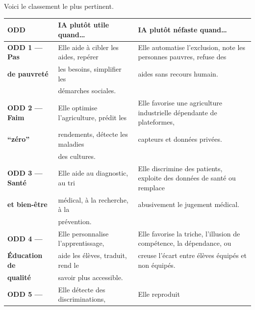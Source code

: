 \documentclass[
  10pt,
  a4paper,
  DIV=11,
  numbers=noendperiod,
  oneside]{scrreprt}
\newcounter{none} %
\let\oldtextbf\textbf
\renewcommand{\textbf}[1]{\oldtextbf{\textcolor{cmmnavy}{#1}}}
\begin{document}
Voici le classement le plus pertinent.

{\def\LTcaptype{none} %
\begin{longtable}[]{@{}
  >{\raggedright\arraybackslash}p{}
  >{\raggedright\arraybackslash}p{}
  >{\raggedright\arraybackslash}p{}@{}}
\toprule\noalign{}
\begin{minipage}[b]{\linewidth}\raggedright
ODD
\end{minipage} & \begin{minipage}[b]{\linewidth}\raggedright
IA plutôt utile quand\ldots{}
\end{minipage} & \begin{minipage}[b]{\linewidth}\raggedright
IA plutôt néfaste quand\ldots{}
\end{minipage} \\
\midrule\noalign{}
\endhead
\bottomrule\noalign{}
\endlastfoot
\textbf{ODD 1 --- Pas} & Elle aide à cibler les aides, repérer & Elle
automatise l'exclusion, note les personnes pauvres, refuse des \\
\textbf{de pauvreté} & les besoins, simplifier les & aides sans recours
humain. \\
& démarches sociales. & \\
\textbf{ODD 2 --- Faim} & Elle optimise l'agriculture, prédit les & Elle
favorise une agriculture industrielle dépendante de plateformes, \\
\textbf{``zéro''} & rendements, détecte les maladies & capteurs et
données privées. \\
& des cultures. & \\
\textbf{ODD 3 --- Santé} & Elle aide au diagnostic, au tri & Elle
discrimine des patients, exploite des données de santé ou remplace \\
\textbf{et bien-être} & médical, à la recherche, à la & abusivement le
jugement médical. \\
& prévention. & \\
\textbf{ODD 4 ---} & Elle personnalise l'apprentissage, & Elle favorise
la triche, l'illusion de compétence, la dépendance, ou \\
\textbf{Éducation de} & aide les élèves, traduit, rend le & creuse
l'écart entre élèves équipés et non équipés. \\
\textbf{qualité} & savoir plus accessible. & \\
\textbf{ODD 5 ---} & Elle détecte des discriminations, & Elle reproduit

\end{longtable}}
\end{document}
